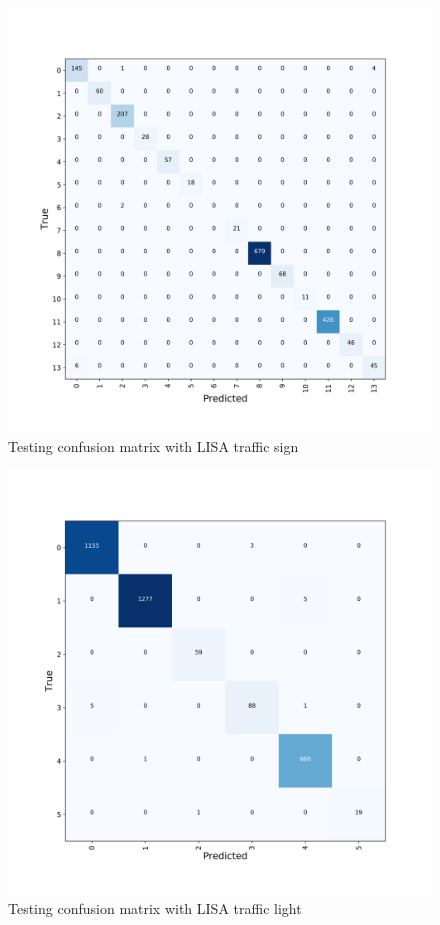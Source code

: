 \documentclass[conference]{IEEEtran}
\begin{document}
\begin{figure}[H]
\centering
  \begin{minipage}{.3\textwidth}
    \centering
    \includegraphics[width=1.0\linewidth]{confusion_matrix.png}
    \caption{Testing confusion matrix with LISA traffic sign}
    \label{fig:fig_1}
  \end{minipage}
\end{figure}
\begin{figure}[H]
\centering
  \begin{minipage}{.3\textwidth}
    \centering
    \includegraphics[width=1.0\linewidth]{confusion_matrix_traffic_light.png}
    \caption{Testing confusion matrix with LISA traffic light}
    \label{fig:fig_1}
  \end{minipage}
\end{figure}
\end{document}
